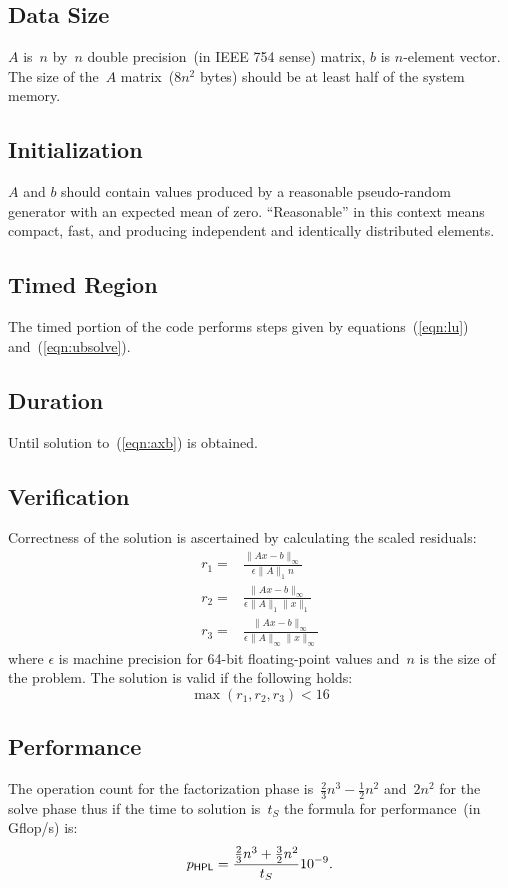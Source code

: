 \documentclass[twocolumn,draft]{article}
\newcommand{\hpl}{\textsf{\scriptsize HPL}\xspace}
\begin{document}
\subsection{Data Size}
$A$ is~$n$ by~$n$ double precision~(in IEEE 754 sense) matrix, $b$ is $n$-element
vector. The size of the~$A$ matrix~($8n^2$ bytes) should be at least half of
the system memory.

\subsection{Initialization}
$A$ and $b$ should contain values produced by a reasonable pseudo-random
generator with an expected mean of zero. ``Reasonable'' in this context means
compact, fast, and producing independent and identically distributed elements.

\subsection{Timed Region}
The timed portion of the code performs steps given by equations~(\ref{eqn:lu})
and~(\ref{eqn:ubsolve}).

\subsection{Duration}
Until solution to~(\ref{eqn:axb}) is obtained.

\subsection{Verification}
Correctness of the solution is ascertained by calculating the scaled residuals:
\begin{eqnarray}
r_1 = & \frac{\|Ax-b\|_{\infty}}{\epsilon \|A\|_1 n} \\
r_2 = &\frac{\|Ax-b\|_{\infty}}{\epsilon \|A\|_1 \|x\|_1} \\
r_3 = &\frac{\|Ax-b\|_{\infty}}{\epsilon \|A\|_{\infty} \|x\|_{\infty}}
\end{eqnarray}
where $\epsilon$ is machine precision for 64-bit floating-point values and~$n$
is the size of the problem. The solution is valid if the following holds:
\begin{equation}
  \max(r_1, r_2, r_3) < 16
\end{equation}

\subsection{Performance}
The operation count for the factorization phase
is~$\frac{2}{3}n^3-\frac{1}{2}n^2$ and~$2n^2$ for the solve phase thus if the
time to solution is~$t_S$ the formula for performance~(in Gflop/s) is:
\begin{equation}
  p_{\hpl}=\frac{\frac{2}{3}n^3+\frac{3}{2}n^2}{t_S}10^{-9}.
\end{equation}
\end{document}
